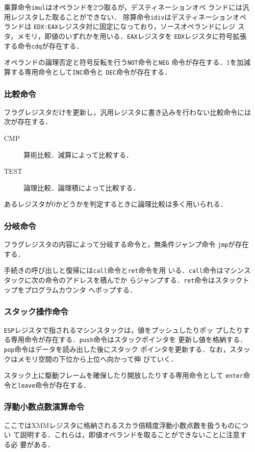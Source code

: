 \documentclass[a4paper,titlepage,disablejfam]{jsbook}
\begin{document}
乗算命令\lstinline|imul|はオペランドを2つ取るが，デスティネーションオペ
ランドには汎用レジスタした取ることができない．
除算命令\lstinline|idiv|はデスティネーションオペランドは
\lstinline|EDX:EAX|レジスタ対に固定になっており，ソースオペランドにレジ
スタ，メモリ，即値のいずれかを用いる．\lstinline|EAX|レジスタを
\lstinline|EDX|レジスタに符号拡張する命令\lstinline|cdq|が存在する．

オペランドの論理否定と符号反転を行う\lstinline|NOT|命令と\lstinline|NEG|
命令が存在する．1を加減算する専用命令として\lstinline|INC|命令と
\lstinline|DEC|命令が存在する．

\subsubsection{比較命令}
フラグレジスタだけを更新し，汎用レジスタに書き込みを行わない比較命令には
次が存在する．
\begin{description}
 \item[CMP] 算術比較．減算によって比較する．
 \item[TEST] 論理比較．論理積によって比較する．
\end{description}
あるレジスタが0かどうかを判定するときに論理比較は多く用いられる．

\subsubsection{分岐命令}
フラグレジスタの内容によって分岐する命令と，無条件ジャンプ命令
\lstinline|jmp|が存在する．

手続きの呼び出しと復帰には\lstinline|call|命令と\lstinline|ret|命令を用
いる．\lstinline|call|命令はマシンスタックに次の命令のアドレスを積んでか
らジャンプする．\lstinline|ret|命令はスタックトップをプログラムカウンタ
へポップする．

\subsubsection{スタック操作命令}
\lstinline|ESP|レジスタで指されるマシンスタックは，値をプッシュしたりポッ
プしたりする専用命令が存在する．\lstinline|push|命令はスタックポインタを
更新し値を格納する．\lstinline|pop|命令はデータを読み出した後にスタック
ポインタを更新する．なお，スタックはメモリ空間の下位から上位へ向かって伸
びていく．

スタック上に駆動フレームを確保したり開放したりする専用命令として
\lstinline|enter|命令と\lstinline|leave|命令が存在する．

\subsubsection{浮動小数点数演算命令}
ここではXMMレジスタに格納されるスカラ倍精度浮動小数点数を扱うものについ
て説明する．これらは，即値オペランドを取ることができないことに注意する必
要がある．
\end{document}
